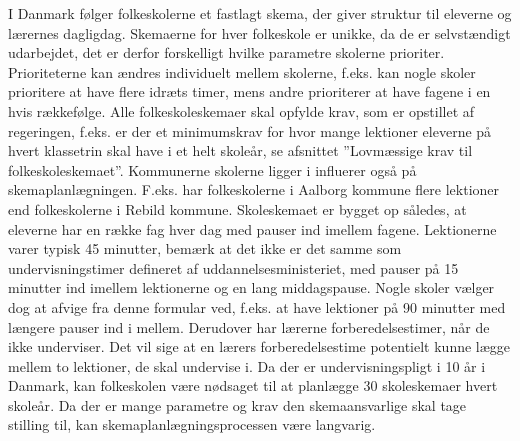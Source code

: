 I Danmark følger folkeskolerne et fastlagt skema, der giver struktur til eleverne og lærernes dagligdag. Skemaerne for hver folkeskole er unikke, da de er selvstændigt udarbejdet, det er derfor forskelligt hvilke parametre skolerne prioriter. Prioriteterne kan ændres individuelt mellem skolerne, f.eks. kan nogle skoler prioritere at have flere idræts timer, mens andre prioriterer at have fagene i en hvis rækkefølge. Alle folkeskoleskemaer skal opfylde krav, som er opstillet af regeringen, f.eks. er der et minimumskrav for hvor mange lektioner eleverne på hvert klassetrin skal have i et helt skoleår, se afsnittet ”Lovmæssige krav til folkeskoleskemaet”. Kommunerne skolerne ligger i influerer også på skemaplanlægningen. F.eks. har folkeskolerne i Aalborg kommune flere lektioner end folkeskolerne i Rebild kommune. Skoleskemaet er bygget op således, at eleverne har en række fag hver dag med pauser ind imellem fagene. Lektionerne varer typisk 45 minutter, bemærk at det ikke er det samme som undervisningstimer defineret af uddannelsesministeriet, med pauser på 15 minutter ind imellem lektionerne og en lang middagspause. Nogle skoler vælger dog at afvige fra denne formular ved, f.eks. at have lektioner på 90 minutter med længere pauser ind i mellem. Derudover har lærerne forberedelsestimer, når de ikke underviser. Det vil sige at en lærers forberedelsestime potentielt kunne lægge mellem to lektioner, de skal undervise i. Da der er undervisningspligt i 10 år i Danmark, kan folkeskolen være nødsaget til at planlægge 30 skoleskemaer hvert skoleår\cite{lov2016}. Da der er mange parametre og krav den skemaansvarlige skal tage stilling til, kan skemaplanlægningsprocessen være langvarig\cite{interview}.